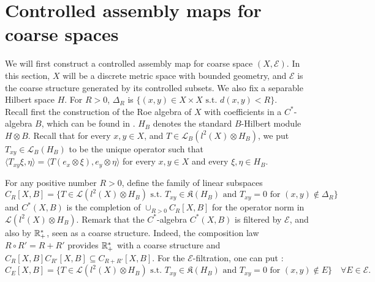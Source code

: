\section{Controlled assembly maps for coarse spaces}

We will first construct a controlled assembly map for coarse space $(X,\mathcal E)$. In this section, $X$ will be a discrete metric space with bounded geometry, and $\mathcal E$ is the coarse structure generated by its controlled subsets. We also fix a separable Hilbert space $H$. For $R>0$, $\Delta_R$ is $\{(x,y)\in X\times X\text{ s.t. }d(x,y)<R\}$. \\

Recall first the construction of the Roe algebra of $X$ with coefficients in a $C^*$-algebra $B$, which can be found in \cite{SkTuYu}. $H_B$ denotes the standard $B$-Hilbert module $H\otimes B$. Recall that for every $x,y\in X$, and $T\in\mathcal L_B(l^2(X)\otimes H_B)$, we put $T_{xy}\in\mathcal L_B(H_B)$ to be the unique operator such that $\langle T_{xy}\xi,\eta\rangle = \langle T(e_x\otimes \xi),e_y\otimes\eta\rangle $ for every $x,y\in X$ and every $\xi,\eta\in H_B$.

For any positive number $R>0$, define the family of linear subspaces 
\[C_R[X,B]=\{T\in \mathcal L(l^2(X)\otimes H_B) \text{ s.t. } T_{xy}\in \mathfrak K(H_B) \text{ and }T_{xy}=0 \text{ for }(x,y)\not\in \Delta_R  \}\]
and $C^*(X,B)$ is the completion of $\cup_{R>0} C_R[X,B]$ for the operator norm in $\mathcal L(l^2(X)\otimes H_B) $. Remark that the $C^*$-algebra $C^*(X,B)$ is filtered by $\mathcal E$, and also by $\mathbb R_+^*$, seen as a coarse structure. Indeed, the composition law $R\circ R'= R+R'$ provides $\mathbb R_+^*$ with a coarse structure and $C_R[X,B] C_{R'} [X,B]\subseteq C_{R+R'}[X,B]$. For the $\mathcal E$-filtration, one can put :
\[C_E[X,B]=\{T\in \mathcal L(l^2(X)\otimes H_B) \text{ s.t. } T_{xy}\in \mathfrak K(H_B) \text{ and }T_{xy}=0 \text{ for }(x,y)\not\in E \}\quad \forall E\in\mathcal E.\]



